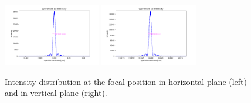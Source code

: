 \documentclass{iucr}              %
\newcommand{\todo}[1]{{\color{red}[TODO: "#1'']}}
\begin{document}
\begin{table}[]
    \centering
    \caption{Beam sizes calculated with simplified wave optics propagation (point source and ideal lenses with aperture for modeling the element dimensions). \todo{implement a sort of multielectron system - implement the slope error} }
    \label{tablewofry1D}
\end{table}

\begin{figure}
\label{wofry1D}
\centering
\includegraphics[width=4.25cm]{GRAPHICS/wofry1Dh.png}
\includegraphics[width=4.25cm]{GRAPHICS/wofry1Dv.png}
\caption{Intensity distribution at the focal position in horizontal plane (left) and in vertical plane (right).}
\end{figure}
\end{document}
